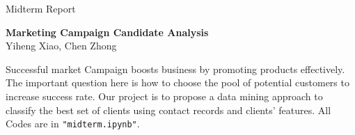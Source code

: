 \documentclass[forprint]{mytemplate}
\begin{document}
\baselineskip=14pt  %
\setlength{\columnsep}{20pt}


\renewcommand{\thefootnote}{\fnsymbol{footnote}}


\begin{flushleft}
{ \heiti Midterm Report}
\end{flushleft}
\vspace{1cm}
\begin{center}
{  \textbf{Marketing Campaign Candidate Analysis}}\\
{Yiheng Xiao, Chen Zhong}
\end{center}
\vspace{0.5cm}
\begin{enabstract}
 Successful market Campaign boosts business by promoting products effectively. The important question here is how to choose the pool of potential customers to increase success rate. Our project is to propose a data mining approach to classify the best set of clients using contact records and clients' features. All Codes are in {\color{green}\texttt{"midterm.ipynb"}}.
\end{enabstract}
\vspace*{2em}
\end{document}
